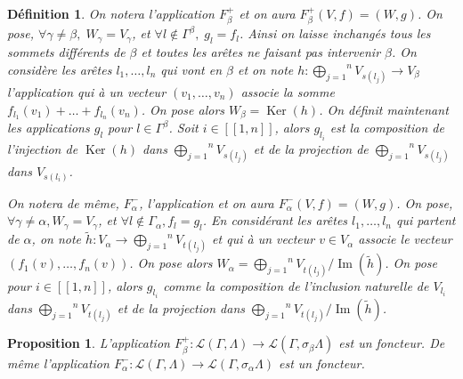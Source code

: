 \documentclass[a4paper,10pt]{article}
\newtheorem{defi}[]{Définition}[section]
\newtheorem{prop}[]{Proposition}[section]
\DeclareMathOperator{\Ker}{Ker}
\DeclareMathOperator{\Img}{Im}
\begin{document}
\begin{defi}
	On notera l'application $F_{\beta}^{+}$ et on aura $F_{\beta}^{+}(V,f)=(W,g)$. On pose, $\forall \gamma\neq\beta,\;W_{\gamma}=V_{\gamma}$, et $\forall l \notin \Gamma^{\beta},\; g_{l}=f_{l}$. Ainsi on laisse inchangés tous les sommets différents de $\beta$ et toutes les arêtes ne faisant pas intervenir $\beta$. On considère les arêtes $l_{1},\dots,l_{n}$ qui vont en $\beta$ et on note $h:\overset{n}{\underset{j=1}{\bigoplus}}V_{s(l_{j})}\rightarrow V_{\beta}$ l'application qui à un vecteur $(v_{1},\dots,v_{n})$ associe la somme $f_{l_{1}}(v_{1})+\dots+f_{l_{n}}(v_{n})$. On pose alors $W_{\beta}=\Ker(h)$. On définit maintenant les applications $g_{l}$ pour $l\in\Gamma^{\beta}$. Soit $i\in[\![1,n]\!]$, alors $g_{l_{i}}$ est la composition de l'injection de $\Ker(h)$ dans $\overset{n}{\underset{j=1}{\bigoplus}}V_{s(l_{j})}$ et de la projection de $\overset{n}{\underset{j=1}{\bigoplus}}V_{s(l_{j})}$ dans $V_{s(l_{i})}$. 

	On notera de même, $F^{-}_{\alpha}$, l'application et on aura $F^{-}_{\alpha}(V,f) = (W,g)$. On pose, $\forall \gamma \neq \alpha, W_\gamma = V_\gamma$, et $\forall l \notin \Gamma_\alpha, f_l = g_l$. En considérant les arêtes $l_1, \dots, l_n$ qui partent de $\alpha$, on note $\widetilde{h} : V_\alpha \rightarrow \overset{n}{\underset{j=1}{\bigoplus}}V_{t(l_{j})}$ et qui à un vecteur $v \in V_\alpha$ associe le vecteur $(f_1(v),\dots, f_n(v))$. On pose alors $W_\alpha = \overset{n}{\underset{j=1}{\bigoplus}}V_{t(l_{j})}/\Img(\widetilde{h})$. On pose pour $i\in [\![1,n]\!]$, alors $g_{l_i}$ comme la composition de l'inclusion naturelle de $V_{l_i}$ dans $\overset{n}{\underset{j=1}{\bigoplus}}V_{t(l_{j})}$ et de la projection dans $\overset{n}{\underset{j=1}{\bigoplus}}V_{t(l_{j})}/\Img(\widetilde h)$.

\end{defi}

\begin{prop}
	L'application $F_{\beta}^{+}:\mathscr{L}(\Gamma,\Lambda)\rightarrow\mathscr{L}(\Gamma,\sigma_{\beta}\Lambda)$ est un foncteur. De même l'application $F_{\alpha}^{-}:\mathscr{L}(\Gamma,\Lambda)\rightarrow\mathscr{L}(\Gamma,\sigma_{\alpha}\Lambda)$ est un foncteur.
\end{prop}
\end{document}
